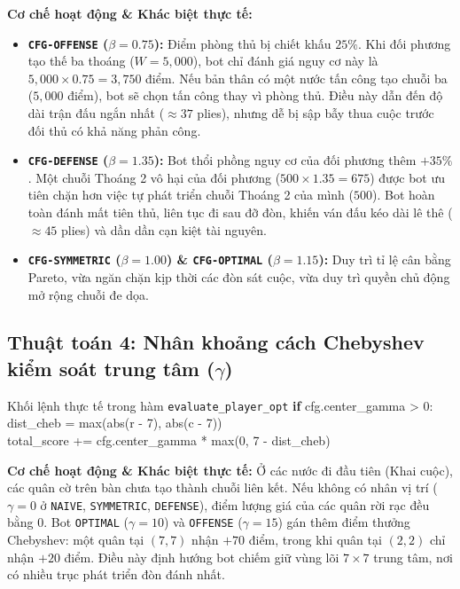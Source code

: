 \documentclass[11pt,a4paper]{article}
\begin{document}
\textbf{Cơ chế hoạt động \& Khác biệt thực tế:}
\begin{itemize}
    \item \textbf{\texttt{CFG-OFFENSE} ($\beta = 0.75$):} Điểm phòng thủ bị chiết khấu $25\%$. Khi đối phương tạo thế ba thoáng ($W = 5{,}000$), bot chỉ đánh giá nguy cơ này là $5{,}000 \times 0.75 = 3{,}750$ điểm. Nếu bản thân có một nước tấn công tạo chuỗi ba ($5{,}000$ điểm), bot sẽ chọn tấn công thay vì phòng thủ. Điều này dẫn đến độ dài trận đấu ngắn nhất ($\approx 37$ plies), nhưng dễ bị sập bẫy thua cuộc trước đối thủ có khả năng phản công.
    \item \textbf{\texttt{CFG-DEFENSE} ($\beta = 1.35$):} Bot thổi phồng nguy cơ của đối phương thêm $+35\%$. Một chuỗi Thoáng 2 vô hại của đối phương ($500 \times 1.35 = 675$) được bot ưu tiên chặn hơn việc tự phát triển chuỗi Thoáng 2 của mình ($500$). Bot hoàn toàn đánh mất tiên thủ, liên tục đi sau đỡ đòn, khiến ván đấu kéo dài lê thê ($\approx 45$ plies) và dần dần cạn kiệt tài nguyên.
    \item \textbf{\texttt{CFG-SYMMETRIC} ($\beta = 1.00$) \& \texttt{CFG-OPTIMAL} ($\beta = 1.15$):} Duy trì tỉ lệ cân bằng Pareto, vừa ngăn chặn kịp thời các đòn sát cuộc, vừa duy trì quyền chủ động mở rộng chuỗi đe dọa.
\end{itemize}

\subsection{Thuật toán 4: Nhân khoảng cách Chebyshev kiểm soát trung tâm (\texorpdfstring{$\gamma$}{Gamma})}
\begin{codebox}{Khối lệnh thực tế trong hàm \texttt{evaluate\_player\_opt}}
\small\ttfamily
\textbf{if} cfg.center\_gamma > 0:\\
\quad dist\_cheb = max(abs(r - 7), abs(c - 7))\\
\quad total\_score += cfg.center\_gamma * max(0, 7 - dist\_cheb)
\end{codebox}

\textbf{Cơ chế hoạt động \& Khác biệt thực tế:}
Ở các nước đi đầu tiên (Khai cuộc), các quân cờ trên bàn chưa tạo thành chuỗi liên kết. Nếu không có nhân vị trí ($\gamma = 0$ ở \texttt{NAIVE}, \texttt{SYMMETRIC}, \texttt{DEFENSE}), điểm lượng giá của các quân rời rạc đều bằng $0$. Bot \texttt{OPTIMAL} ($\gamma = 10$) và \texttt{OFFENSE} ($\gamma = 15$) gán thêm điểm thưởng Chebyshev: một quân tại $(7, 7)$ nhận $+70$ điểm, trong khi quân tại $(2, 2)$ chỉ nhận $+20$ điểm. Điều này định hướng bot chiếm giữ vùng lõi $7 \times 7$ trung tâm, nơi có nhiều trục phát triển đòn đánh nhất.
\end{document}

